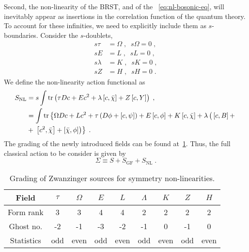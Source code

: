 \documentclass[../main.tex]{subfiles}
\begin{document}
Second, the non-linearity of the BRST, and of the ~\eqref{eq:nl-bosonic-eq}, will inevitably appear as insertions in the correlation function of the quantum theory. To account for these infinities, we need to explicitly include them as $ s $-boundaries. Consider the $ s $-doublets,
\begin{subequations}%
  \label{eq:nl-s-doublets}
  \begin{align}
    s\tau    & = \Omega \;, \;\; s\Omega   = 0 \;, \\
    sE       & = L \;, \;\; sL        = 0 \;,      \\
    s\lambda & = K \;, \;\; sK        = 0 \;,      \\
    sZ       & = H \;, \;\; sH        = 0 \;.
  \end{align}
\end{subequations}
We define the non-linearity action functional as
\begin{subequations}%
  \label{eq:nl-action}
  \begin{align}
    S_{\text{NL}} & = s \int \operatorname{tr} \left( \tau Dc + E c^2 + \lambda \left[ c,\bar\chi \right] + Z \left[ c,Y \right] \right) \;, \label{eq:nl-action-1}                                                                                           \\
                  & = \int \operatorname{tr} \left\{ \Omega Dc + Lc^2 + \tau \left( D\phi + \left[ c,\psi \right] \right) + E \left[ c,\phi \right] + K \left[ c,\bar\chi \right] + \lambda \left(\vphantom{^2}\left[ c,B \right] + \right. \right. \nonumber \\
                  & + \left. \left. \left[ c^2,\bar\chi \right] + \left[ \bar\chi,\phi \right] \right) \right\} \;.
  \end{align}
\end{subequations}
The grading of the newly introduced fields can be found at~\ref{tab:nl-sources}. Thus, the full classical action to be consider is given by
\begin{equation}
  \label{eq:total-action}
  \Sigma \equiv S + S_{\text{GF}} + S_{ \text{NL} }\; .
\end{equation}

\begin{table}[htpb]
  \caption{Grading of Zwanzinger sources for symmetry non-linearities.}%
  \label{tab:nl-sources}
  \begin{tabular}{ccccccccc}
    \toprule
    Field      & $\tau$ & $\Omega$ & $E$ & $L$  & $\Lambda$ & $K$  & $Z$ & $H$  \\
    \midrule
    Form rank  & 3      & 3        & 4   & 4    & 2         & 2    & 2   & 2    \\
    Ghost no.  & -2     & -1       & -3  & -2   & -1        & 0    & -1  & 0    \\
    Statistics & odd    & even     & odd & even & odd       & even & odd & even \\
    \bottomrule
  \end{tabular}
\end{table}
\end{document}
